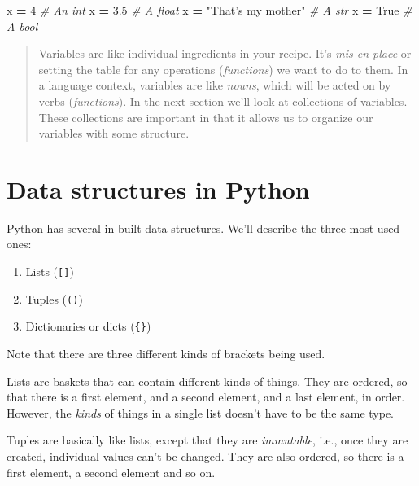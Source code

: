 \documentclass[
  letterpaper,
]{scrbook}
\newenvironment{Shaded}{\begin{snugshade}}{\end{snugshade}}
\newcommand{\CommentTok}[1]{\textcolor[rgb]{0.56,0.35,0.01}{\textit{#1}}}
\newcommand{\DecValTok}[1]{\textcolor[rgb]{0.00,0.00,0.81}{#1}}
\newcommand{\FloatTok}[1]{\textcolor[rgb]{0.00,0.00,0.81}{#1}}
\newcommand{\NormalTok}[1]{#1}
\newcommand{\OperatorTok}[1]{\textcolor[rgb]{0.81,0.36,0.00}{\textbf{#1}}}
\newcommand{\StringTok}[1]{\textcolor[rgb]{0.31,0.60,0.02}{#1}}
\newcommand{\VariableTok}[1]{\textcolor[rgb]{0.00,0.00,0.00}{#1}}
\providecommand{\tightlist}{%
  \setlength{\itemsep}{0pt}\setlength{\parskip}{0pt}}
\begin{document}
\begin{Shaded}
\begin{Highlighting}[]
\NormalTok{x }\OperatorTok{=} \DecValTok{4}  \CommentTok{# An int}
\NormalTok{x }\OperatorTok{=} \FloatTok{3.5}  \CommentTok{# A float}
\NormalTok{x }\OperatorTok{=} \StringTok{"That's my mother"}  \CommentTok{# A str}
\NormalTok{x }\OperatorTok{=} \VariableTok{True}  \CommentTok{# A bool}
\end{Highlighting}
\end{Shaded}

\begin{quote}
Variables are like individual ingredients in your recipe. It's \emph{mis en place} or setting the table for any operations (\emph{functions}) we want to do to them. In a language context, variables are like \emph{nouns}, which will be acted on by verbs (\emph{functions}). In the next section we'll look at collections of variables. These collections are important in that it allows us to organize our variables with some structure.
\end{quote}

\hypertarget{data-structures-in-python}{%
\section{Data structures in Python}\label{data-structures-in-python}}

Python has several in-built data structures. We'll describe the three most used ones:

\begin{enumerate}
\def\labelenumi{\arabic{enumi}.}
\tightlist
\item
  Lists (\texttt{{[}{]}})
\item
  Tuples (\texttt{()})
\item
  Dictionaries or dicts (\texttt{\{\}})
\end{enumerate}

Note that there are three different kinds of brackets being used.

Lists are baskets that can contain different kinds of things. They are ordered, so that there is a first element, and a second element, and a last element, in order. However, the \emph{kinds} of things in a single list doesn't have to be the same type.

Tuples are basically like lists, except that they are \emph{immutable}, i.e., once they are created, individual values can't be changed. They are also ordered, so there is a first element, a second element and so on.
\end{document}

